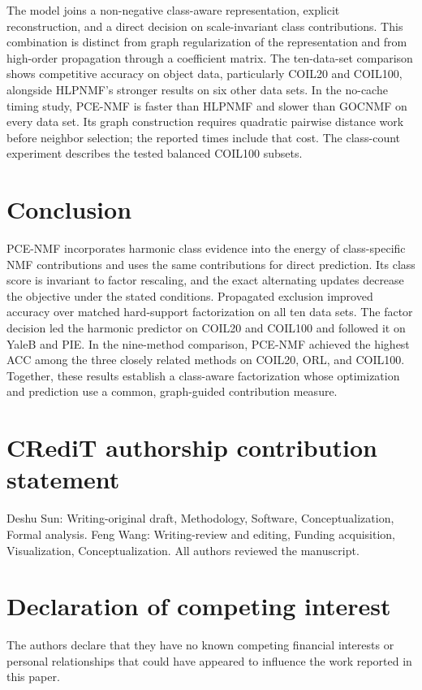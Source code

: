\documentclass[preprint,12pt]{elsarticle}
\theoremstyle{remark}
\begin{document}
The model joins a non-negative class-aware representation, explicit
reconstruction, and a direct decision on scale-invariant class
contributions. This combination is distinct from graph regularization
of the representation and from high-order propagation through a
coefficient matrix. The ten-data-set comparison shows competitive
accuracy on object data, particularly COIL20 and COIL100, alongside
HLPNMF's stronger results on six other data sets. In the no-cache
timing study, PCE-NMF is faster than HLPNMF and slower than GOCNMF on
every data set. Its graph construction requires quadratic pairwise
distance work before neighbor selection; the reported times include
that cost. The class-count experiment describes the tested balanced
COIL100 subsets.

\section{Conclusion}

PCE-NMF incorporates harmonic class evidence into the energy of
class-specific NMF contributions and uses the same contributions for
direct prediction. Its class score is invariant to factor rescaling,
and the exact alternating updates decrease the objective under the
stated conditions. Propagated exclusion improved accuracy over matched
hard-support factorization on all ten data sets. The factor decision
led the harmonic predictor on COIL20 and COIL100 and followed it on
YaleB and PIE. In the nine-method comparison, PCE-NMF achieved the
highest ACC among the three closely related methods on COIL20, ORL,
and COIL100. Together, these results establish a class-aware
factorization whose optimization and prediction use a common,
graph-guided contribution measure.


\section*{CRediT authorship contribution statement}

Deshu Sun: Writing-original draft, Methodology, Software, Conceptualization, Formal analysis.  Feng Wang: Writing-review and editing, Funding acquisition, Visualization, Conceptualization. All authors reviewed the manuscript.


\section*{Declaration of competing interest}
The authors declare that they have no known competing financial interests or personal relationships that could have appeared to influence the work reported in this paper.
\end{document}
